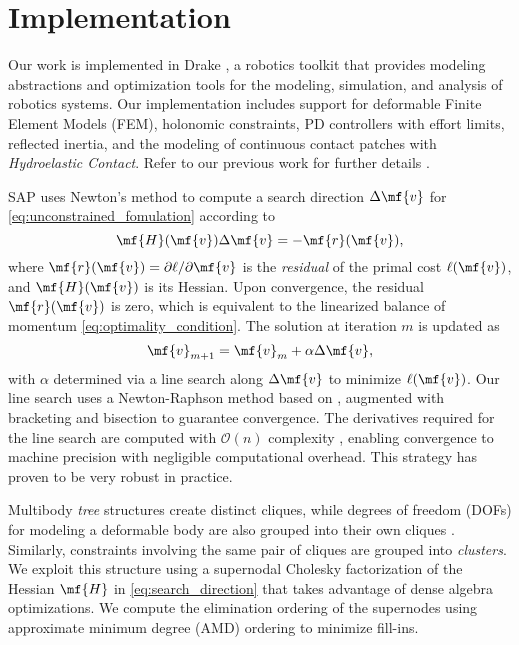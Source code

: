 \section{Implementation}
\label{sec:implementation}

Our work is implemented in Drake \cite{bib:drake}, a robotics toolkit that
provides modeling abstractions and optimization tools for the modeling,
simulation, and analysis of robotics systems. Our implementation includes support
for deformable Finite Element Models (FEM), holonomic constraints, PD
controllers with effort limits, reflected inertia, and the modeling of
continuous contact patches with \emph{Hydroelastic Contact}. Refer to our
previous work for further details
\cite{bib:castro2022unconstrained,bib:masterjohn2021discrete,bib:han2023}.

SAP \cite{bib:castro2022unconstrained} uses Newton's method to compute a search
direction $\Delta\mf{v}$ for \eqref{eq:unconstrained_fomulation} according to
\begin{equation}
    \mf{H}(\mf{v})\Delta\mf{v} = -\mf{r}(\mf{v}),
    \label{eq:search_direction}
\end{equation}
where $\mf{r}(\mf{v})=\partial\ell/\partial\mf{v}$ is the \emph{residual} of the
primal cost $\ell(\mf{v})$, and $\mf{H}(\mf{v})$ is its Hessian. Upon convergence,
the residual $\mf{r}(\mf{v})$ is zero, which is equivalent to the linearized
balance of momentum \eqref{eq:optimality_condition}. The solution at iteration
$m$ is updated as
\begin{equation*}
    \mf{v}_{m+1} = \mf{v}_{m} + \alpha\Delta\mf{v},
\end{equation*}
with $\alpha$ determined via a line search along $\Delta\mf{v}$ to minimize
$\ell(\mf{v})$. Our line search uses a Newton-Raphson method based on \cite[\S
9.4]{bib:numerical_recipes}, augmented with bracketing and bisection to
guarantee convergence. The derivatives required for the line search are computed with
$\mathcal{O}(n)$ complexity \cite{bib:castro2022unconstrained}, enabling
convergence to machine precision with negligible computational overhead.
This strategy has proven to be very robust in practice.

Multibody \emph{tree} structures create distinct cliques, while degrees of
freedom (DOFs) for modeling a deformable body are also grouped into their own
cliques \cite{bib:han2023}. Similarly, constraints involving the same pair of
cliques are grouped into \emph{clusters}. We exploit this structure using a
supernodal Cholesky factorization \cite[\S 9]{bib:davis2016survey} of the
Hessian $\mf{H}$ in \eqref{eq:search_direction} that takes advantage of dense
algebra optimizations. We compute the elimination ordering of the supernodes using
approximate minimum degree (AMD) ordering \cite{bib:amestoy1996approximate} to
minimize fill-ins.

